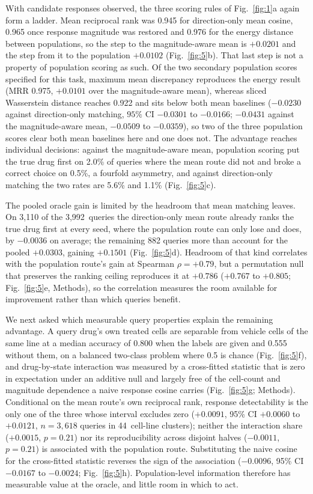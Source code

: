 \documentclass[11pt,letterpaper]{article}
\newcommand{\NQUERIES}{3,992}           %
\newcommand{\NCTX}{44}                  %
\begin{document}
With candidate responses observed, the three scoring rules of Fig.~\ref{fig:1}a again form a ladder. Mean reciprocal rank was 0.945 for direction-only mean cosine, 0.965 once response magnitude was restored and 0.976 for the energy distance between populations, so the step to the magnitude-aware mean is $+0.0201$ and the step from it to the population $+0.0102$ (Fig.~\ref{fig:5}b). That last step is not a property of population scoring as such. Of the two secondary population scores specified for this task, maximum mean discrepancy reproduces the energy result (MRR 0.975, $+0.0101$ over the magnitude-aware mean), whereas sliced Wasserstein distance reaches 0.922 and sits below both mean baselines ($-0.0230$ against direction-only matching, $95\%$ CI $-0.0301$ to $-0.0166$; $-0.0431$ against the magnitude-aware mean, $-0.0509$ to $-0.0359$), so two of the three population scores clear both mean baselines here and one does not. The advantage reaches individual decisions: against the magnitude-aware mean, population scoring put the true drug first on 2.0\% of queries where the mean route did not and broke a correct choice on 0.5\%, a fourfold asymmetry, and against direction-only matching the two rates are 5.6\% and 1.1\% (Fig.~\ref{fig:5}c).

The pooled oracle gain is limited by the headroom that mean matching leaves. On 3,110 of the \NQUERIES\ queries the direction-only mean route already ranks the true drug first at every seed, where the population route can only lose and does, by $-0.0036$ on average; the remaining 882 queries more than account for the pooled $+0.0303$, gaining $+0.1501$ (Fig.~\ref{fig:5}d). Headroom of that kind correlates with the population route's gain at Spearman $\rho=+0.79$, but a permutation null that preserves the ranking ceiling reproduces it at $+0.786$ ($+0.767$ to $+0.805$; Fig.~\ref{fig:5}e, Methods), so the correlation measures the room available for improvement rather than which queries benefit.

We next asked which measurable query properties explain the remaining advantage. A query drug's own treated cells are separable from vehicle cells of the same line at a median accuracy of 0.800 when the labels are given and 0.555 without them, on a balanced two-class problem where 0.5 is chance (Fig.~\ref{fig:5}f), and drug-by-state interaction was measured by a cross-fitted statistic that is zero in expectation under an additive null and largely free of the cell-count and magnitude dependence a naive response cosine carries (Fig.~\ref{fig:5}g; Methods). Conditional on the mean route's own reciprocal rank, response detectability is the only one of the three whose interval excludes zero ($+0.0091$, 95\% CI $+0.0060$ to $+0.0121$, $n=3{,}618$ queries in \NCTX\ cell-line clusters); neither the interaction share ($+0.0015$, $p=0.21$) nor its reproducibility across disjoint halves ($-0.0011$, $p=0.21$) is associated with the population route. Substituting the naive cosine for the cross-fitted statistic reverses the sign of the association ($-0.0096$, 95\% CI $-0.0167$ to $-0.0024$; Fig.~\ref{fig:5}h). Population-level information therefore has measurable value at the oracle, and little room in which to act.
\end{document}
